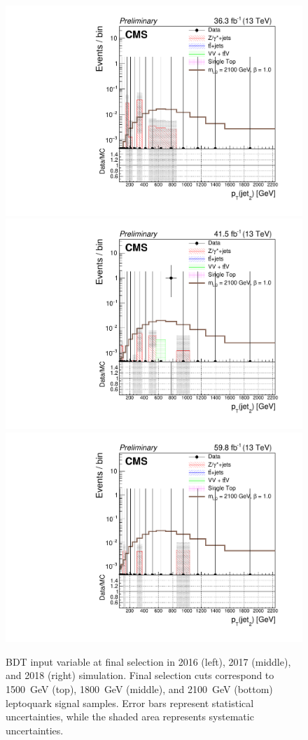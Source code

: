 \begin{figure}[H]
    {\includegraphics[width=.32\textwidth]{Images/Analysis/Results_2016_Unblinded/Plots/Final_selection/BasicLQ_uujj_Pt_jet2_final2100.pdf}}
    {\includegraphics[width=.32\textwidth]{Images/Analysis/Results_2017_Unblinded/Plots/Final_selection/BasicLQ_uujj_Pt_jet2_final2100.pdf}}
    {\includegraphics[width=.32\textwidth]{Images/Analysis/Results_2018_Unblinded/Plots/Final_selection/BasicLQ_uujj_Pt_jet2_final2100.pdf}}
    \caption{BDT input variable \ptof{\jetTwo} at final selection in 2016 (left), 2017 (middle), and 2018 (right) simulation. Final selection cuts correspond to \SI{1500}{GeV} (top), \SI{1800}{GeV} (middle), and \SI{2100}{GeV} (bottom) leptoquark signal samples. Error bars represent statistical uncertainties, while the shaded area represents systematic uncertainties.
    \label{figapp:finalSelptj2}}
\end{figure}
